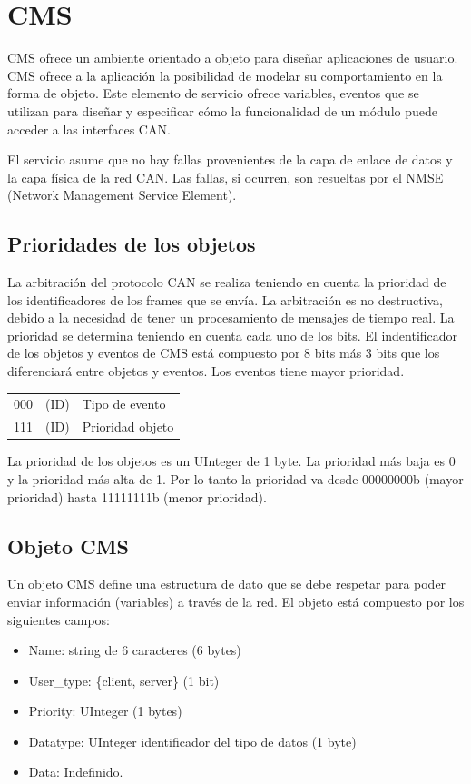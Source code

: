 \section{CMS}
CMS ofrece un ambiente orientado a objeto para diseñar aplicaciones de usuario. CMS ofrece a la aplicación la posibilidad de modelar su comportamiento en la forma de objeto. Este elemento de servicio ofrece variables, eventos que se utilizan para diseñar y especificar cómo la funcionalidad de un módulo puede acceder a las interfaces CAN.

El servicio asume que no hay fallas provenientes de la capa de enlace de datos y la capa física de la red CAN. Las fallas, si ocurren, son resueltas por el NMSE (Network Management Service Element).

\subsection{Prioridades de los objetos}
La arbitración del protocolo CAN se realiza teniendo en cuenta la prioridad de los identificadores de los frames que se envía. La arbitración es no destructiva, debido a la necesidad de tener un procesamiento de mensajes de tiempo real. La prioridad se determina teniendo en cuenta cada uno de los bits. El indentificador de los objetos y eventos de CMS está compuesto por 8 bits más 3 bits que los diferenciará entre objetos y eventos. Los eventos tiene mayor prioridad.

\begin{tabular}{lll}
    000 & (ID) & Tipo de evento \\
    111 & (ID) & Prioridad objeto \\
\end{tabular}

La prioridad de los objetos es un UInteger de 1 byte. La prioridad más baja es 0 y la prioridad más alta de 1. Por lo tanto la prioridad va desde 00000000b (mayor prioridad) hasta 11111111b (menor prioridad).

\subsection{Objeto CMS}
Un objeto CMS define una estructura de dato que se debe respetar para poder enviar información (variables) a través de la red. El objeto está compuesto por los siguientes campos:
\begin{itemize}
   \item Name: string de 6 caracteres (6 bytes)
   \item User\_type: \{client, server\} (1 bit)
   \item Priority: UInteger (1 bytes)
   \item Datatype: UInteger identificador del tipo de datos (1 byte)
   \item Data: Indefinido.
\end{itemize}

